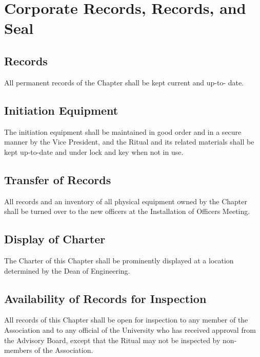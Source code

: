 \documentclass{article}
\begin{document}
	\section{Corporate Records, Records, and Seal}
	\subsection{Records}
	All permanent records of the Chapter shall be kept current and up-to- date.
	\subsection{Initiation Equipment}
	The initiation equipment shall be maintained in good order and in a secure manner by the Vice President, and the Ritual and its related materials shall be kept up-to-date and under lock and key when not in use.
	\subsection{Transfer of Records}
	All records and an inventory of all physical equipment owned by the Chapter shall be turned over to the new officers at the Installation of Officers Meeting.
	\subsection{Display of Charter}
	The Charter of this Chapter shall be prominently displayed at a location determined by the Dean of Engineering.
	\subsection{Availability of Records for Inspection}
	All records of this Chapter shall be open for inspection to any member of the Association and to any official of the University who has received approval from the Advisory Board, except that the Ritual may not be inspected by non-members of the Association.
\end{document}
